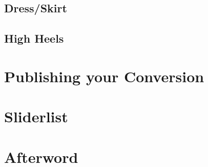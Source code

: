 \documentclass[12pt]{article}
\begin{document}
\subsection{Dress/Skirt}

\pagebreak
\subsection{High Heels}

\pagebreak
\section{Publishing your Conversion}

\pagebreak
\section{Sliderlist}

\pagebreak
\section{Afterword}

\end{document}
